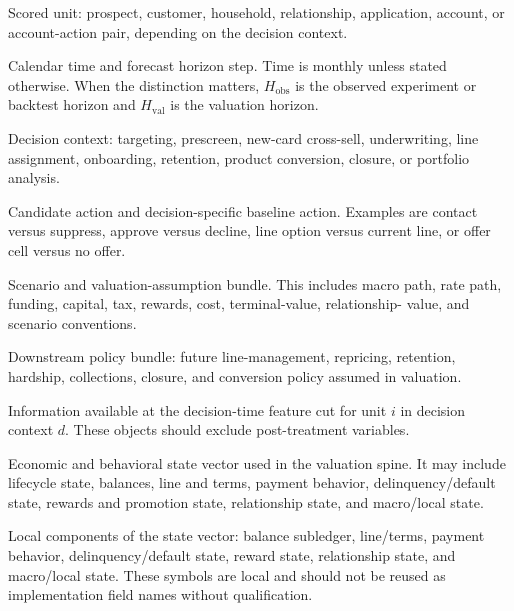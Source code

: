 \documentclass[11pt]{article}
\newcommand{\1}{\mathbf{1}}
\begin{document}
\begin{description}[leftmargin=*,style=nextline]
  \item[$i$]
  Scored unit: prospect, customer, household, relationship, application,
  account, or account-action pair, depending on the decision context.

  \item[$t$ and $h$]
  Calendar time and forecast horizon step. Time is monthly unless stated
  otherwise. When the distinction matters, $H_{\mathrm{obs}}$ is the observed
  experiment or backtest horizon and $H_{\mathrm{val}}$ is the valuation
  horizon.

  \item[$d$]
  Decision context: targeting, prescreen, new-card cross-sell, underwriting,
  line assignment, onboarding, retention, product conversion, closure, or
  portfolio analysis.

  \item[$a$ and $a_0(d)$]
  Candidate action and decision-specific baseline action. Examples are contact
  versus suppress, approve versus decline, line option versus current line, or
  offer cell versus no offer.

  \item[$s$]
  Scenario and valuation-assumption bundle. This includes macro path, rate
  path, funding, capital, tax, rewards, cost, terminal-value, relationship-
  value, and scenario conventions.

  \item[$\pi$]
  Downstream policy bundle: future line-management, repricing, retention,
  hardship, collections, closure, and conversion policy assumed in valuation.

  \item[$X_{it}^{d}$ or $\mathcal{I}_{id}$]
  Information available at the decision-time feature cut for unit $i$ in
  decision context $d$. These objects should exclude post-treatment variables.

  \item[$S_{it}$]
  Economic and behavioral state vector used in the valuation spine. It may
  include lifecycle state, balances, line and terms, payment behavior,
  delinquency/default state, rewards and promotion state, relationship state,
  and macro/local state.

  \item[$B$, $L$, $P$, $D$, $Rwd$, $Rel$, and $M$]
  Local components of the state vector: balance subledger, line/terms, payment
  behavior, delinquency/default state, reward state, relationship state, and
  macro/local state. These symbols are local and should not be reused as
  implementation field names without qualification.


\end{description}
\end{document}
